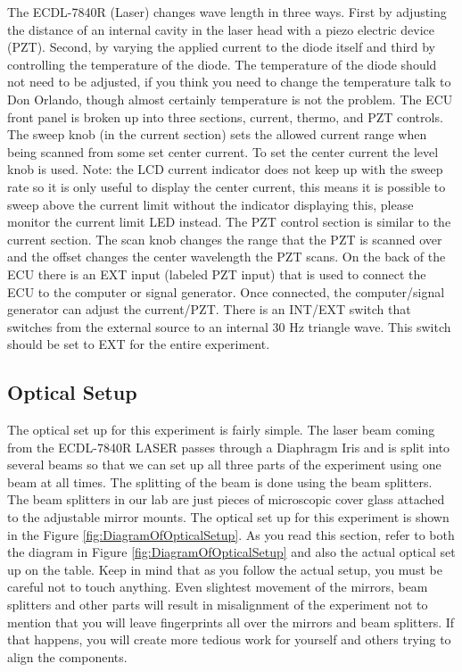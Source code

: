 \documentclass{../lab}
\begin{document}
The ECDL-7840R (Laser) changes wave length in three ways. First by adjusting the distance of an internal cavity in the laser head with a piezo electric device (PZT). Second, by varying the applied current to the diode itself and third by controlling the temperature of the diode. The temperature of the diode should not need to be adjusted, if you think you need to change the temperature talk to Don Orlando, though almost certainly temperature is not the problem. The ECU front panel is broken up into three sections, current, thermo, and PZT controls. The sweep knob (in the current section) sets the allowed current range when being scanned from some set center current. To set the center current the level knob is used. Note: the LCD current indicator does not keep up with the sweep rate so it is only useful to display the center current, this means it is possible to sweep above the current limit without the indicator displaying this, please monitor the current limit LED instead. The PZT control section is similar to the current section. The scan knob changes the range that the PZT is scanned over and the offset changes the center wavelength the PZT scans. On the back of the ECU there is an EXT input (labeled PZT input) that is used to connect the ECU to the computer or signal generator. Once connected, the computer/signal generator can adjust the current/PZT. There is an INT/EXT switch that switches from the external source to an internal 30 Hz triangle wave. This switch should be set to EXT for the entire experiment.

\subsection{Optical Setup}

The optical set up for this experiment is fairly simple. The laser beam coming from the ECDL-7840R LASER passes through a Diaphragm Iris and is split into several beams so that we can set up all three parts of the experiment using one beam at all times. The splitting of the beam is done using the beam splitters. The beam splitters in our lab are just pieces of microscopic cover glass attached to the adjustable mirror mounts. The optical set up for this experiment is shown in the Figure \ref{fig:DiagramOfOpticalSetup}. As you read this section, refer to both the diagram in Figure \ref{fig:DiagramOfOpticalSetup} and also the actual optical set up on the table. Keep in mind that as you follow the actual setup, you must be careful not to touch anything. Even slightest movement of the mirrors, beam splitters and other parts will result in misalignment of the experiment not to mention that you will leave fingerprints all over the mirrors and beam splitters. If that happens, you will create more tedious work for yourself and others trying to align the components.
\end{document}
